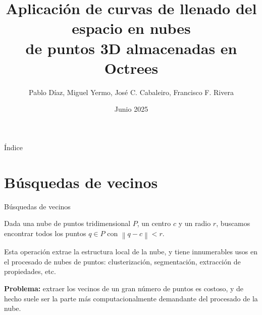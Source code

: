 \documentclass[aspectratio=169]{beamer}
\title{Aplicación de curvas de llenado del espacio en nubes \\ de puntos 3D almacenadas en Octrees}
\author{Pablo Díaz, Miguel Yermo, José C. Cabaleiro, Francisco F. Rivera}
\date{Junio 2025}
\def\toctitle{Índice}
\begin{document}
\begin{frame}[plain]%
    \titlepage%
    
\end{frame}
  
\begin{frame}[plain]{\toctitle}
    \tableofcontents
\end{frame}
\setcounter{framenumber}{0} %

\section{Búsquedas de vecinos}

\begin{frame}{Búsquedas de vecinos}

Dada una nube de puntos tridimensional $P$, un centro $c$ y un radio $r$, buscamos encontrar todos los puntos $q \in P$ con $\left\lVert q-c \right\rVert < r$.

Esta operación extrae la estructura local de la nube, y tiene innumerables usos en el procesado de nubes de puntos: clusterización, segmentación, extracción de propiedades, etc.
\vspace{2em}

\textbf{Problema:} extraer los vecinos de un gran número de puntos es costoso, y de hecho suele ser la parte más computacionalmente demandante del procesado de la nube.
\end{frame}
\end{document}

